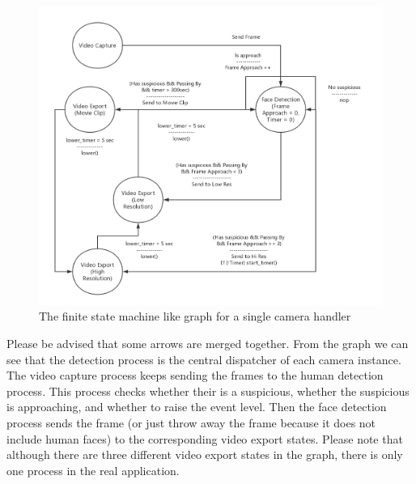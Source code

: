 \documentclass{article}
\begin{document}
\begin{figure}[h!]
\includegraphics[width=12cm]{EECS488_FSM.png}
\caption{The finite state machine like graph for a single camera handler}
\end{figure}

\indent Please be advised that some arrows are merged together.\newline
\indent From the graph we can see that the detection process is the central dispatcher of each camera instance. The video capture process keeps sending the frames to the human detection process. This process checks whether their is a suspicious, whether the suspicious is approaching, and whether to raise the event level. Then the face detection process sends the frame (or just throw away the frame because it does not include human faces) to the corresponding video export states. Please note that although there are three different video export states in the graph, there is only one process in the real application.
\end{document}
